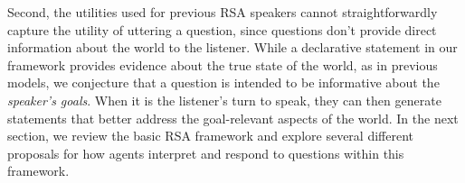 \documentclass[11pt, floatsintext]{apa6}
\begin{document}
Second, the utilities used for previous RSA speakers cannot straightforwardly capture the utility of uttering a question, since questions don't provide direct information about the world to the listener.
While a declarative statement in our framework provides evidence about the true state of the world, as in previous models, we conjecture that a question is intended to be informative about the \emph{speaker's goals}. 
When it is the listener's turn to speak, they can then generate statements that better address the goal-relevant aspects of the world. 
In the next section, we review the basic RSA framework and explore several different proposals for how agents interpret and respond to questions within this framework.




\end{document}

